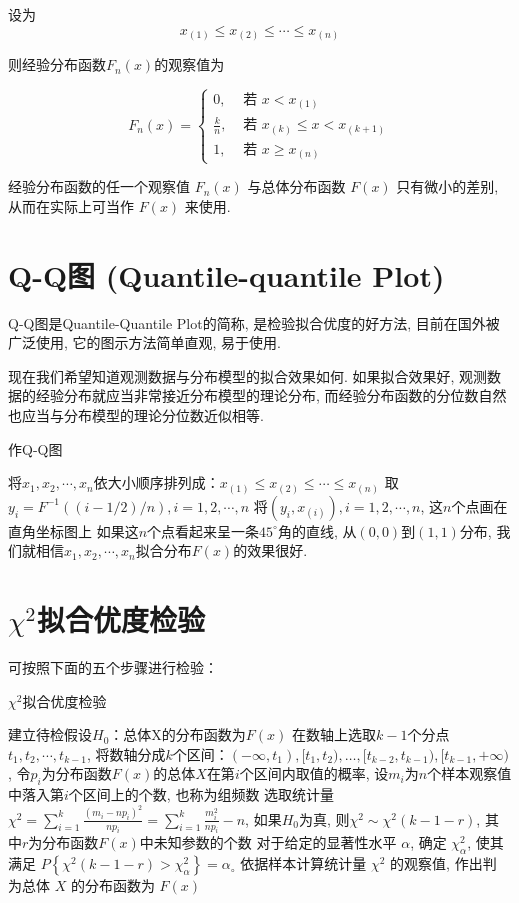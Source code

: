 设为
$$
x_{(1)} \leq x_{(2)} \leq \cdots \leq x_{(n)}
$$

则经验分布函数$F_{n}(x)$的观察值为

$$
F_{n}(x)=\left\{\begin{array}{ll}
0, & \text { 若 } x<x_{(1)} \\
\frac{k}{n}, & \text { 若 } x_{(k)} \leq x<x_{(k+1)} \\
1, & \text { 若 } x \geq x_{(n)}
\end{array}\right.
$$

经验分布函数的任一个观察值 $F_n(x)$ 与总体分布函数 $F(x)$ 只有微小的差别, 从而在实际上可当作 $F(x)$ 来使用. 

\section{Q-Q图 (Quantile-quantile Plot)}

Q-Q图是Quantile-Quantile Plot的简称, 是检验拟合优度的好方法, 目前在国外被广泛使用, 它的图示方法简单直观, 易于使用. 

现在我们希望知道观测数据与分布模型的拟合效果如何. 如果拟合效果好, 观测数据的经验分布就应当非常接近分布模型的理论分布, 而经验分布函数的分位数自然也应当与分布模型的理论分位数近似相等. 

\begin{algorithm}
    \caption{作Q-Q图}
    
将$x_1,x_2,\cdots,x_n$依大小顺序排列成：$x_{(1)}\le x_{(2)}\le\cdots\le x_{(n)}$\;
取$y_i=F^{-1}((i-1/2)/n), i=1,2,\cdots,n$\;
将$(y_i,x_{(i)}), i=1,2,\cdots,n$, 这$n$个点画在直角坐标图上\;
如果这$n$个点看起来呈一条$45^\circ$角的直线, 从$(0,0)$到$(1,1)$分布, 我们就相信$x_1,x_2,\cdots,x_n$拟合分布$F(x)$的效果很好. 
\end{algorithm}

\section{$\chi^2$拟合优度检验}

可按照下面的五个步骤进行检验：

\begin{algorithm}
\caption{$\chi^2$拟合优度检验}
建立待检假设$H_0$：总体X的分布函数为$F(x)$\;
在数轴上选取$k-1$个分点$t_1,t_2,\cdots,t_{k-1}$, 将数轴分成$k$个区间：$(-\infty,t_1), [t_1,t_2), …, [t_{k-2},t_{k-1}), [t_{k-1},+\infty)$, 令$p_i$为分布函数$F(x)$的总体$X$在第$i$个区间内取值的概率, 设$m_i$为$n$个样本观察值中落入第$i$个区间上的个数, 也称为组频数\;
选取统计量$\chi^2=\sum_{i=1}^{k}\frac{(m_i-np_i)^2}{np_i}=\sum_{i=1}^{k}{\frac{m_i^2}{np_i}-n}$, 如果$H_0$为真, 则$\chi^2 \sim \chi^2(k-1-r)$, 其中$r$为分布函数$F(x)$中未知参数的个数\;
对于给定的显著性水平 \( \alpha \), 确定 \( \chi_{\alpha}^{2} \), 使其满足 \( P\left\{\chi^{2}(k-1-r)>\chi_{\alpha}^{2}\right\}=\alpha_{\circ} \) \;
依据样本计算统计量 \( \chi^{2} \) 的观察值, 作出判
为总体 \( X \) 的分布函数为 \( F(x) \) \;
\end{algorithm}

